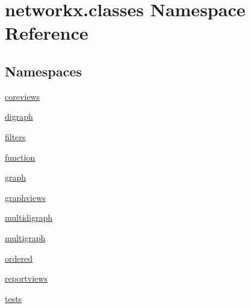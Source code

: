 \hypertarget{namespacenetworkx_1_1classes}{}\section{networkx.\+classes Namespace Reference}
\label{namespacenetworkx_1_1classes}
\subsection*{Namespaces}
\begin{DoxyCompactItemize}
\item 
 \hyperlink{namespacenetworkx_1_1classes_1_1coreviews}{coreviews}
\item 
 \hyperlink{namespacenetworkx_1_1classes_1_1digraph}{digraph}
\item 
 \hyperlink{namespacenetworkx_1_1classes_1_1filters}{filters}
\item 
 \hyperlink{namespacenetworkx_1_1classes_1_1function}{function}
\item 
 \hyperlink{namespacenetworkx_1_1classes_1_1graph}{graph}
\item 
 \hyperlink{namespacenetworkx_1_1classes_1_1graphviews}{graphviews}
\item 
 \hyperlink{namespacenetworkx_1_1classes_1_1multidigraph}{multidigraph}
\item 
 \hyperlink{namespacenetworkx_1_1classes_1_1multigraph}{multigraph}
\item 
 \hyperlink{namespacenetworkx_1_1classes_1_1ordered}{ordered}
\item 
 \hyperlink{namespacenetworkx_1_1classes_1_1reportviews}{reportviews}
\item 
 \hyperlink{namespacenetworkx_1_1classes_1_1tests}{tests}
\end{DoxyCompactItemize}

